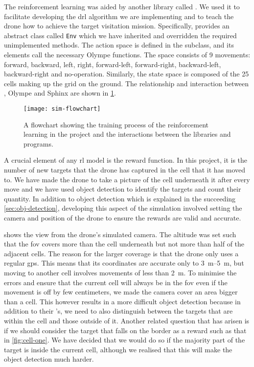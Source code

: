 \documentclass[../main.tex]{subfiles}
\begin{document}
The reinforcement learning was aided 
by another library called \gym.
We used it to facilitate developing the
\gls{drl} algorithm we are implementing and to 
teach the drone how to achieve the 
target visitation mission.
Specifically, \gym provides an abstract class 
called \texttt{Env}
which we have inherited and overridden the 
required unimplemented methods.
The action space is defined in the subclass, and its
elements call the necessary Olympe functions. 
The space consists of 9 movements: 
forward, backward, left,
right, forward-left, forward-right, backward-left,
backward-right and no-operation.
Similarly, the state space is composed of the 25 cells
making up the grid on the ground. 
The relationship and interaction between \gym, Olympe
and Sphinx are shown in \cref{fig:sim-flowchart}.

\begin{figure}[p]
    \centering
    \texttt{[image: sim-flowchart]}
    \caption{A flowchart showing the training process
        of the reinforcement learning in the project
        and the interactions between the libraries
        and programs.}
    \label{fig:sim-flowchart}
\end{figure}

A crucial element of any \gls{rl} model
is the reward function. In this project, it
is the number of new targets that the drone has captured
in the cell that it has moved to. We have made the drone
to take a picture of the cell underneath it after 
every move and we have used object detection to
identify the targets and count their quantity. 
In addition to object detection which is explained
in the succeeding \cref{sec:obj-detection}, developing this
aspect of the simulation involved 
setting the camera and position of the drone to ensure
the rewards are valid and accurate.

 shows the view from the drone's
simulated camera. The altitude was set such that
the \gls{fov} covers more than the cell underneath
but not more than half of the adjacent cells.
The reason for the larger coverage is that
the \anafi drone only uses a regular \gls{gps}.
This means that its coordinates are accurate only
to \SIrange{3}{5}{\meter}, but moving to another
cell involves
movements of less than \SI{2}{\meter}.
To minimise the errors and ensure that the current
cell will always be in the \gls{fov} even if the
movement is off by few centimeters, we made the camera
cover an area bigger than a cell. 
This however results in a more difficult
object detection because in addition to their 
\id's, we need to also distinguish between
the targets that are within the cell and 
those outside of it.
Another related question that has arisen is if we 
should consider the target that falls on the border 
as a reward such as that in \cref{fig:cell-one}. 
We have decided that we would do so if
the majority part of the target is inside the current
cell, although we realised that this will make the
object detection much harder.
\end{document}
